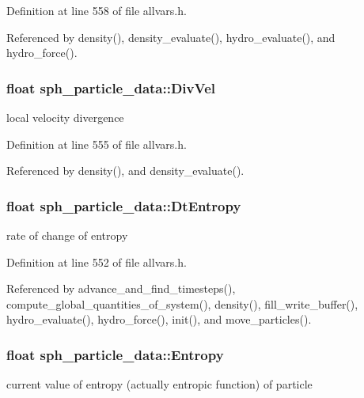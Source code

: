 Definition at line 558 of file allvars.h.



Referenced by density(), density\_\-evaluate(), hydro\_\-evaluate(), and hydro\_\-force().

\hypertarget{structsph__particle__data_a1af47e5f5e7ef9e4a656411c468c8d14}{
\subsubsection[{DivVel}]{\setlength{\rightskip}{0pt plus 5cm}float {\bf sph\_\-particle\_\-data::DivVel}}}
\label{structsph__particle__data_a1af47e5f5e7ef9e4a656411c468c8d14}
local velocity divergence 

Definition at line 555 of file allvars.h.



Referenced by density(), and density\_\-evaluate().

\hypertarget{structsph__particle__data_a27aeefa50674867d3dec1c359b7191c8}{
\subsubsection[{DtEntropy}]{\setlength{\rightskip}{0pt plus 5cm}float {\bf sph\_\-particle\_\-data::DtEntropy}}}
\label{structsph__particle__data_a27aeefa50674867d3dec1c359b7191c8}
rate of change of entropy 

Definition at line 552 of file allvars.h.



Referenced by advance\_\-and\_\-find\_\-timesteps(), compute\_\-global\_\-quantities\_\-of\_\-system(), density(), fill\_\-write\_\-buffer(), hydro\_\-evaluate(), hydro\_\-force(), init(), and move\_\-particles().

\hypertarget{structsph__particle__data_a7cbe9bb2086f525f400b2c12103b3116}{
\subsubsection[{Entropy}]{\setlength{\rightskip}{0pt plus 5cm}float {\bf sph\_\-particle\_\-data::Entropy}}}
\label{structsph__particle__data_a7cbe9bb2086f525f400b2c12103b3116}
current value of entropy (actually entropic function) of particle 

